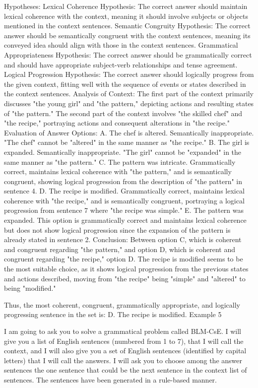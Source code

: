 Hypotheses:
Lexical Coherence Hypothesis: The correct answer should maintain lexical coherence with the context, meaning it should involve subjects or objects mentioned in the context sentences.
Semantic Congruity Hypothesis: The correct answer should be semantically congruent with the context sentences, meaning its conveyed idea should align with those in the context sentences.
Grammatical Appropriateness Hypothesis: The correct answer should be grammatically correct and should have appropriate subject-verb relationships and tense agreement.
Logical Progression Hypothesis: The correct answer should logically progress from the given context, fitting well with the sequence of events or states described in the context sentences.
Analysis of Context:
The first part of the context primarily discusses "the young girl" and "the pattern," depicting actions and resulting states of "the pattern."
The second part of the context involves "the skilled chef" and "the recipe," portraying actions and consequent alterations in "the recipe."
Evaluation of Answer Options:
A. The chef is altered.
Semantically inappropriate. "The chef" cannot be "altered" in the same manner as "the recipe."
B. The girl is expanded.
Semantically inappropriate. "The girl" cannot be "expanded" in the same manner as "the pattern."
C. The pattern was intricate.
Grammatically correct, maintains lexical coherence with "the pattern," and is semantically congruent, showing logical progression from the description of "the pattern" in sentence 4.
D. The recipe is modified.
Grammatically correct, maintains lexical coherence with "the recipe," and is semantically congruent, portraying a logical progression from sentence 7 where "the recipe was simple."
E. The pattern was expanded.
This option is grammatically correct and maintains lexical coherence but does not show logical progression since the expansion of the pattern is already stated in sentence 2.
Conclusion:
Between option C, which is coherent and congruent regarding "the pattern," and option D, which is coherent and congruent regarding "the recipe," option D. The recipe is modified seems to be the most suitable choice, as it shows logical progression from the previous states and actions described, moving from "the recipe" being "simple" and "altered" to being "modified."

Thus, the most coherent, congruent, grammatically appropriate, and logically progressing sentence in the set is:
D. The recipe is modified.
Example 5

I am going to ask you to solve a grammatical problem called BLM-CsE.  I will give you a list of English sentences (numbered from 1 to 7), that I will call the context, and I will also give you a set of English sentences (identified by capital letters) that I will call  the answers. I will ask you to choose among the answer sentences the one sentence that could be the next sentence in the context list of sentences. The sentences have been generated in a rule-based manner. 

